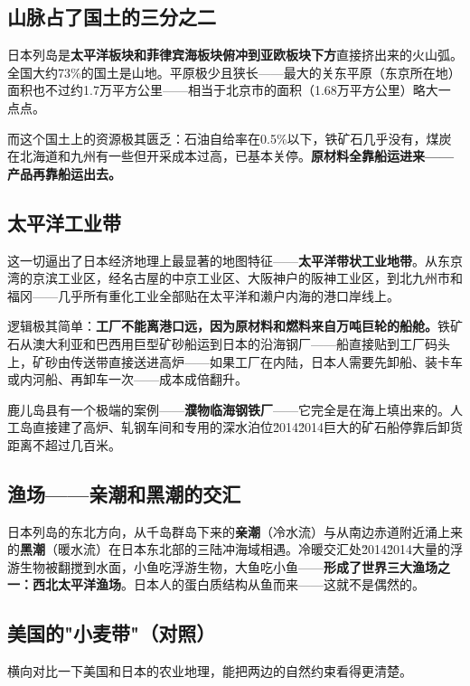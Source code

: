 \documentclass[a4paper,12pt]{ctexart}
\begin{document}
\subsection*{山脉占了国土的三分之二}

日本列岛是\textbf{太平洋板块和菲律宾海板块俯冲到亚欧板块下方}直接挤出来的火山弧。全国大约73\%的国土是山地。平原极少且狭长——最大的关东平原（东京所在地）面积也不过约1.7万平方公里——相当于北京市的面积（1.68万平方公里）略大一点点。

而这个国土上的资源极其匮乏：石油自给率在0.5\%以下，铁矿石几乎没有，煤炭在北海道和九州有一些但开采成本过高，已基本关停。\textbf{原材料全靠船运进来——产品再靠船运出去。}

\subsection*{太平洋工业带}

这一切逼出了日本经济地理上最显著的地图特征——\textbf{太平洋带状工业地带}。从东京湾的京滨工业区，经名古屋的中京工业区、大阪神户的阪神工业区，到北九州市和福冈——几乎所有重化工业全部贴在太平洋和濑户内海的港口岸线上。

逻辑极其简单：\textbf{工厂不能离港口远，因为原材料和燃料来自万吨巨轮的船舱。}铁矿石从澳大利亚和巴西用巨型矿砂船运到日本的沿海钢厂——船直接贴到工厂码头上，矿砂由传送带直接送进高炉——如果工厂在内陆，日本人需要先卸船、装卡车或内河船、再卸车一次——成本成倍翻升。

鹿儿岛县有一个极端的案例——\textbf{濮物临海钢铁厂}——它完全是在海上填出来的。人工岛直接建了高炉、轧钢车间和专用的深水泊位\u2014\u2014巨大的矿石船停靠后卸货距离不超过几百米。

\subsection*{渔场——亲潮和黑潮的交汇}

日本列岛的东北方向，从千岛群岛下来的\textbf{亲潮}（冷水流）与从南边赤道附近涌上来的\textbf{黑潮}（暖水流）在日本东北部的三陆冲海域相遇。冷暖交汇处\u2014\u2014大量的浮游生物被翻搅到水面，小鱼吃浮游生物，大鱼吃小鱼——\textbf{形成了世界三大渔场之一：西北太平洋渔场}。日本人的蛋白质结构从鱼而来——这就不是偶然的。

\subsection*{美国的"小麦带"（对照）}

横向对比一下美国和日本的农业地理，能把两边的自然约束看得更清楚。
\end{document}
